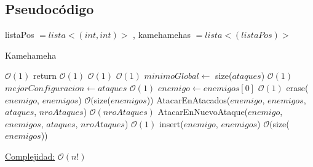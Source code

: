 \documentclass[10pt,a4paper]{article}
\begin{document}
\subsection{Pseudocódigo}
listaPos $= lista<(int,int)>$ , kamehamehas $= lista<(listaPos)>$

\begin{algorithm}
\caption{Kamehameha}
\begin{algorithmic}
	 \Comment $\mathcal{O}(1)$
		\State return \Comment $\mathcal{O}(1)$
	\EndIf
	 \Comment $\mathcal{O}(1)$
		\Comment $\mathcal{O}(1)$
			\State $minimoGlobal \gets$ size($ataques$) \Comment $\mathcal{O}(1)$ 		
			\State $mejorConfiguracion \gets ataques$ \Comment $\mathcal{O}(1)$
		\EndIf
	\Else
		\State $enemigo \gets enemigos[0]$ \Comment $\mathcal{O}(1)$
		\State erase($enemigo$, $enemigos$) \Comment $\mathcal{O}($size($enemigos$))
		\State AtacarEnAtacados($enemigo$, $enemigos$, $ataques$, $nroAtaques$)	\Comment $\mathcal{O}(nroAtaques)$
		\State AtacarEnNuevoAtaque($enemigo$, $enemigos$, $ataques$, $nroAtaques$) \Comment $\mathcal{O}(1)$
		\State insert($enemigo$, $enemigos$) \Comment $\mathcal{O}($size($enemigos$))
\EndIf
\EndFunction
\end{algorithmic}
\underline{Complejidad:} $\mathcal{O}(n!)$\\
    
\end{algorithm}
\end{document}
